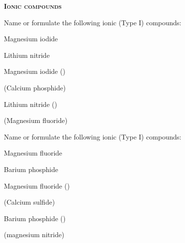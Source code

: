 \documentclass[main.tex]{subfiles}
\begin{document}
\begin{multicols*}{2}
{\raggedright\textsc{\textbf{Ionic compounds}}\par}


\begin{question}[ID=\the\value{numA}]
Name or formulate the following ionic (Type I) compounds:
\begin{inparaenum}[(a)]
\item Magnesium iodide%
\item {}	%
\item Lithium nitride%
\item {}	%
\end{inparaenum}
\end{question}
\begin{solution}
\begin{inparaenum}[(a)]
\item Magnesium iodide ()
\item {}	 (Calcium phosphide)	
\item Lithium nitride ()
\item {}	 (Magnesium fluoride)
 \end{inparaenum}\hspace{0.1cm}\end{solution}
\begin{question}[ID=\the\value{numA}]
Name or formulate the following ionic (Type I) compounds:
\begin{inparaenum}[(a)]
\item Magnesium fluoride%
\item {}	%
\item Barium phosphide%
\item {}	%
\end{inparaenum}
\end{question}
\begin{solution}
\begin{inparaenum}[(a)]
\item Magnesium fluoride ()
\item {}	 (Calcium sulfide)
\item Barium phosphide ()
\item {}	(magnesium nitride)
 \end{inparaenum}\hspace{0.1cm}\end{solution}





\end{multicols*}
\end{document}

